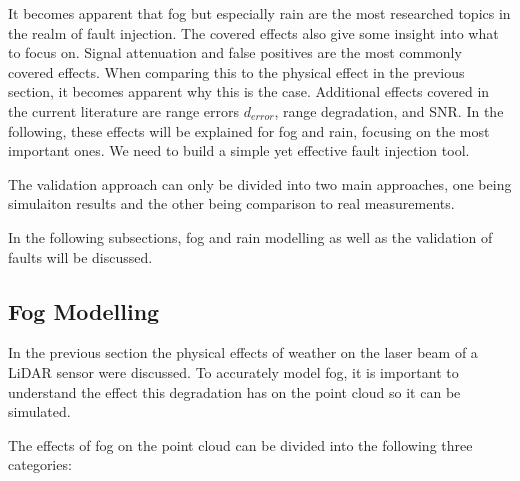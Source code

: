 It becomes apparent that fog but especially rain are the most researched topics in the realm of fault injection. The covered effects also give some insight into what to focus on. Signal attenuation and false positives are the most commonly covered effects. When comparing this to the physical effect in the previous section, it becomes apparent why this is the case. Additional effects covered in the current literature are range errors $d_{error}$, range degradation, and SNR. In the following, these effects will be explained for fog and rain, focusing on the most important ones. We need to build a simple yet effective fault injection tool.

The validation approach can only be divided into two main approaches, one being simulaiton results and the other being comparison to real measurements. 

In the following subsections, fog and rain modelling as well as the validation of faults will be discussed. 



\subsection{Fog Modelling}
In the previous section the physical effects of weather on the laser beam of a LiDAR sensor were discussed. To accurately model fog, it is important to understand the effect this degradation has on the point cloud so it can be simulated. 

The effects of fog on the point cloud can be divided into the following three categories: 

